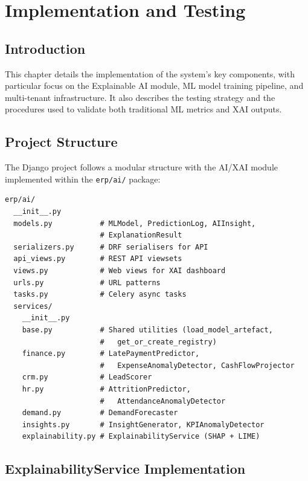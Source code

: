\documentclass[12pt,a4paper]{report}
\begin{document}
%
%
\chapter{Implementation and Testing}
\label{ch:implementation}

\section{Introduction}
\label{sec:impl_intro}

This chapter details the implementation of the system's key components, with particular focus on the Explainable AI module, ML model training pipeline, and multi-tenant infrastructure. It also describes the testing strategy and the procedures used to validate both traditional ML metrics and XAI outputs.

\section{Project Structure}
\label{sec:project_structure}

The Django project follows a modular structure with the AI/XAI module implemented within the \texttt{erp/ai/} package:

\begin{lstlisting}[caption={AI module directory structure},label={lst:ai_structure}]
erp/ai/
  __init__.py
  models.py           # MLModel, PredictionLog, AIInsight,
                      # ExplanationResult
  serializers.py      # DRF serialisers for API
  api_views.py        # REST API viewsets
  views.py            # Web views for XAI dashboard
  urls.py             # URL patterns
  tasks.py            # Celery async tasks
  services/
    __init__.py
    base.py           # Shared utilities (load_model_artefact,
                      #   get_or_create_registry)
    finance.py        # LatePaymentPredictor,
                      #   ExpenseAnomalyDetector, CashFlowProjector
    crm.py            # LeadScorer
    hr.py             # AttritionPredictor,
                      #   AttendanceAnomalyDetector
    demand.py         # DemandForecaster
    insights.py       # InsightGenerator, KPIAnomalyDetector
    explainability.py # ExplainabilityService (SHAP + LIME)
\end{lstlisting}

\section{ExplainabilityService Implementation}
\label{sec:xai_implementation}
\end{document}
